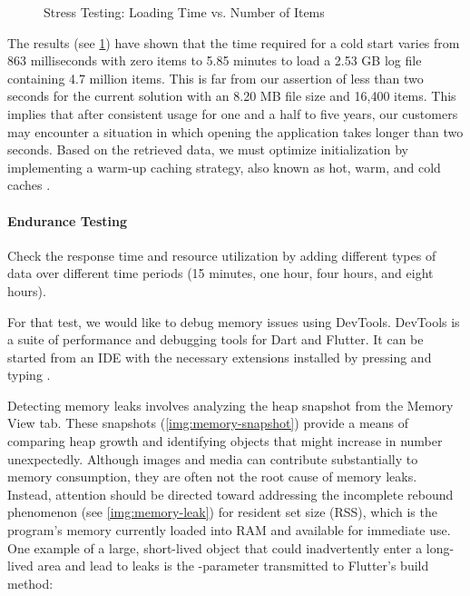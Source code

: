 \begin{figure}
\caption{Stress Testing: Loading Time vs. Number of Items} \label{t-stress}
\end{figure}

\noindent The results (see \cref{t-stress}) have shown that the time required for a cold start varies from 863 
milliseconds with zero items to 5.85 minutes to load a 2.53 GB log file containing 4.7 million items. This is far from 
our assertion of less than two seconds for the current solution with an 8.20 MB file size and 16,400 items. This implies 
that after consistent usage for one and a half to five years, our customers may encounter a situation in which opening 
the application takes longer than two seconds. Based on the retrieved data, we must optimize initialization by 
implementing a warm-up caching strategy, also known as hot, warm, and cold caches \cite{Tom17}.


\paragraph{Endurance Testing}

Check the response time and resource utilization by adding different types of data over different time periods (15 
minutes, one hour, four hours, and eight hours).

For that test, we would like to debug memory issues using DevTools. DevTools is a suite of performance and debugging 
tools for Dart and Flutter. It can be started from an IDE with the necessary extensions installed by pressing  
and typing .

Detecting memory leaks involves analyzing the heap snapshot from the Memory View tab. These snapshots 
(\cref{img:memory-snapshot}) provide a means of comparing heap growth and identifying objects that might increase in 
number unexpectedly. Although images and media can contribute substantially to memory consumption, they are often not 
the root cause of memory leaks. Instead, attention should be directed toward addressing the incomplete rebound 
phenomenon (see \cref{img:memory-leak}) for resident set size (RSS), which is the program's memory currently loaded into 
RAM and available for immediate use. One example of a large, short-lived object that could inadvertently enter a 
long-lived area and lead to leaks is the -parameter transmitted to Flutter's build method:

